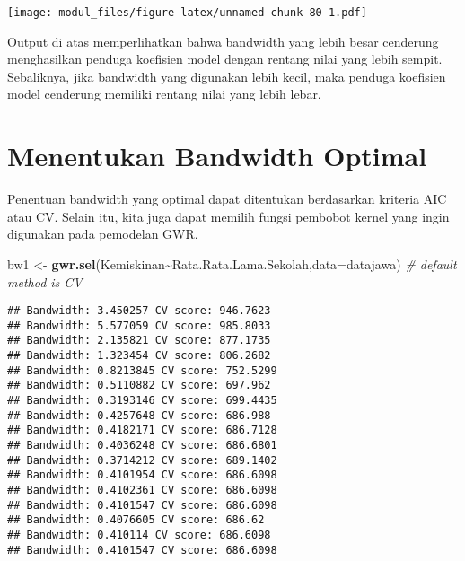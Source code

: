 \documentclass[
]{book}
\newenvironment{Shaded}{\begin{snugshade}}{\end{snugshade}}
\newcommand{\CommentTok}[1]{\textcolor[rgb]{0.56,0.35,0.01}{\textit{#1}}}
\newcommand{\DataTypeTok}[1]{\textcolor[rgb]{0.13,0.29,0.53}{#1}}
\newcommand{\KeywordTok}[1]{\textcolor[rgb]{0.13,0.29,0.53}{\textbf{#1}}}
\newcommand{\NormalTok}[1]{#1}
\newcommand{\OperatorTok}[1]{\textcolor[rgb]{0.81,0.36,0.00}{\textbf{#1}}}
\newcommand{\StringTok}[1]{\textcolor[rgb]{0.31,0.60,0.02}{#1}}
\begin{document}
\begin{Shaded}
\end{Shaded}

\texttt{[image: modul\_files/figure-latex/unnamed-chunk-80-1.pdf]}

Output di atas memperlihatkan bahwa bandwidth yang lebih besar cenderung menghasilkan penduga koefisien model dengan rentang nilai yang lebih sempit. Sebaliknya, jika bandwidth yang digunakan lebih kecil, maka penduga koefisien model cenderung memiliki rentang nilai yang lebih lebar.

\hypertarget{menentukan-bandwidth-optimal}{%
\section{Menentukan Bandwidth Optimal}\label{menentukan-bandwidth-optimal}}

Penentuan bandwidth yang optimal dapat ditentukan berdasarkan kriteria AIC atau CV. Selain itu, kita juga dapat memilih fungsi pembobot kernel yang ingin digunakan pada pemodelan GWR.

\begin{Shaded}
\begin{Highlighting}[]
\NormalTok{bw1 \textless{}{-}}\StringTok{ }\KeywordTok{gwr.sel}\NormalTok{(Kemiskinan}\OperatorTok{\textasciitilde{}}\NormalTok{Rata.Rata.Lama.Sekolah,}\DataTypeTok{data=}\NormalTok{datajawa) }\CommentTok{\# default method is CV}
\end{Highlighting}
\end{Shaded}

\begin{verbatim}
## Bandwidth: 3.450257 CV score: 946.7623 
## Bandwidth: 5.577059 CV score: 985.8033 
## Bandwidth: 2.135821 CV score: 877.1735 
## Bandwidth: 1.323454 CV score: 806.2682 
## Bandwidth: 0.8213845 CV score: 752.5299 
## Bandwidth: 0.5110882 CV score: 697.962 
## Bandwidth: 0.3193146 CV score: 699.4435 
## Bandwidth: 0.4257648 CV score: 686.988 
## Bandwidth: 0.4182171 CV score: 686.7128 
## Bandwidth: 0.4036248 CV score: 686.6801 
## Bandwidth: 0.3714212 CV score: 689.1402 
## Bandwidth: 0.4101954 CV score: 686.6098 
## Bandwidth: 0.4102361 CV score: 686.6098 
## Bandwidth: 0.4101547 CV score: 686.6098 
## Bandwidth: 0.4076605 CV score: 686.62 
## Bandwidth: 0.410114 CV score: 686.6098 
## Bandwidth: 0.4101547 CV score: 686.6098
\end{verbatim}
\end{document}
